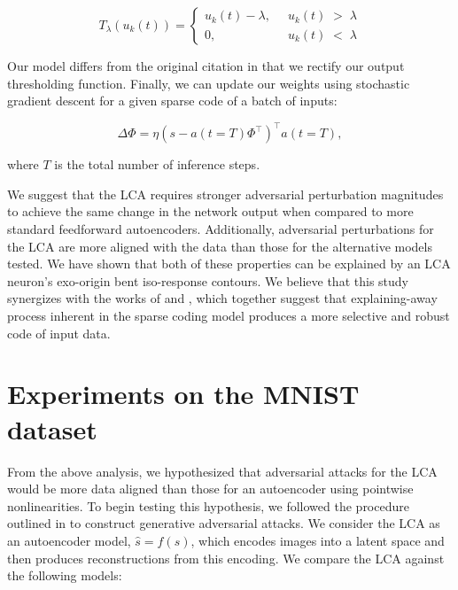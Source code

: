 \begin{equation}\label{lcathresholdfunc}
    T_{\lambda}(u_{k}(t)) = \left\{
    \begin{aligned}
        u_{k}(t)-\lambda,\;\; &u_{k}(t)\; >\; \lambda \\
        0,\;\; &u_{k}(t)\; <\; \lambda
    \end{aligned}
    \right.
\end{equation}

Our model differs from the original citation in that we rectify our output thresholding function. Finally, we can update our weights using stochastic gradient descent for a given sparse code of a batch of inputs:

\begin{equation}\label{phiupdate}
  \Delta \Phi = \eta (s - a(t=T)\Phi^{\top})^{\top} a(t=T),
\end{equation}

where $T$ is the total number of inference steps.

We suggest that the LCA requires stronger adversarial perturbation magnitudes to achieve the same change in the network output when compared to more standard feedforward autoencoders. Additionally, adversarial perturbations for the LCA are more aligned with the data than those for the alternative models tested. We have shown that both of these properties can be explained by an LCA neuron's exo-origin bent iso-response contours. We believe that this study synergizes with the works of \parencite{zhu2013visual} and \parencite{golden2016conjectures}, which together suggest that explaining-away process inherent in the sparse coding model produces a more selective and robust code of input data.


\section{Experiments on the MNIST dataset}
From the above analysis, we hypothesized that adversarial attacks for the LCA would be more data aligned than those for an autoencoder using pointwise nonlinearities. To begin testing this hypothesis, we followed the procedure outlined in \parencite{kos2018adversarial} to construct generative adversarial attacks. We consider the LCA as an autoencoder model, $\hat{s}=f(s)$, which encodes images into a latent space and then produces reconstructions from this encoding. We compare the LCA against the following models:


